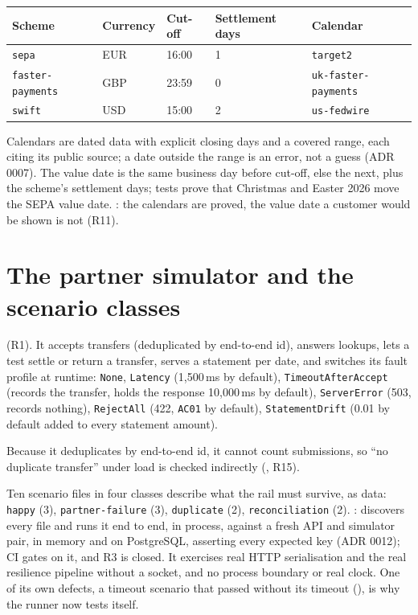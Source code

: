 \documentclass[11pt,a4paper]{article}
\begin{document}
\begin{center}
\begin{tabular}{@{}lllll@{}}
\toprule
Scheme & Currency & Cut-off & Settlement days & Calendar \\
\midrule
\texttt{sepa} & EUR & 16:00 & 1 & \texttt{target2} \\
\texttt{faster-payments} & GBP & 23:59 & 0 & \texttt{uk-faster-payments} \\
\texttt{swift} & USD & 15:00 & 2 & \texttt{us-fedwire} \\
\bottomrule
\end{tabular}
\end{center}

Calendars are dated data with explicit closing days and a covered range, each citing its public
source; a date outside the range is an error, not a guess (ADR 0007). The value date is the same
business day before cut-off, else the next, plus the scheme's settlement days; tests prove that
Christmas and Easter 2026 move the SEPA value date. : the calendars are proved, the value date a customer would be shown is not (R11).

\section{The partner simulator and the scenario classes}

 (R1). It accepts transfers
(deduplicated by end-to-end id), answers lookups, lets a test settle or return a transfer, serves
a statement per date, and switches its fault profile at runtime: \texttt{None},
\texttt{Latency} (1,500\,ms by default), \texttt{TimeoutAfterAccept} (records the transfer, holds
the response 10,000\,ms by default), \texttt{ServerError} (503, records nothing),
\texttt{RejectAll} (422, \texttt{AC01} by default), \texttt{StatementDrift} (0.01 by default added
to every statement amount).

Because it deduplicates by end-to-end id, it cannot count submissions, so ``no duplicate
transfer'' under load is checked indirectly (, R15).

Ten scenario files in four classes describe what the rail must survive, as data: \texttt{happy}
(3), \texttt{partner-failure} (3), \texttt{duplicate} (2), \texttt{reconciliation} (2).
:  discovers every file and runs it end to
end, in process, against a fresh API and simulator pair, in memory and on PostgreSQL, asserting
every expected key (ADR 0012); CI gates on it, and R3 is closed. It exercises real HTTP
serialisation and the real resilience pipeline without a socket, and no process boundary or real
clock. One of its own defects, a timeout scenario that passed without its timeout
(), is why the runner now tests itself.
\end{document}
